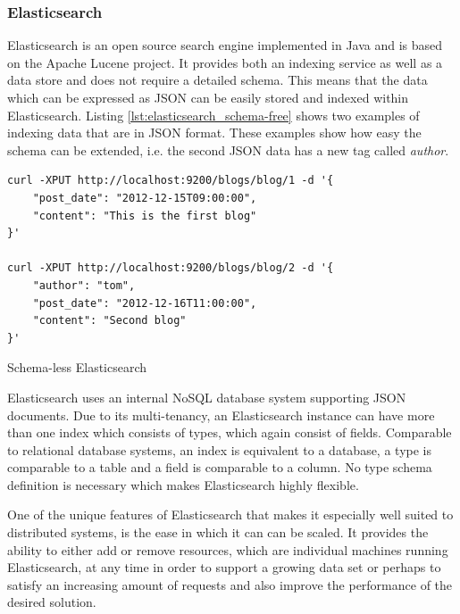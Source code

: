 \subsubsection{Elasticsearch \label{sec:back_se_es}}

Elasticsearch is an open source search engine implemented in Java and is based on the Apache Lucene project. It provides both an indexing service as well as a data store and does not require a detailed schema. This means that the data which can be expressed as \ac{JSON} can be easily stored and indexed within Elasticsearch. Listing \ref{lst:elasticsearch_schema-free} shows two examples of indexing data that are in \ac{JSON} format. These examples show how easy the schema can be extended, i.e. the second \ac{JSON} data has a new tag called \textit{author}.
 
\begin{code}
\begin{verbatim}
curl -XPUT http://localhost:9200/blogs/blog/1 -d '{
    "post_date": "2012-12-15T09:00:00",
    "content": "This is the first blog"
}'

curl -XPUT http://localhost:9200/blogs/blog/2 -d '{
    "author": "tom",
    "post_date": "2012-12-16T11:00:00",
    "content": "Second blog"
}'
\end{verbatim}
\caption{Schema-less Elasticsearch}
\label{lst:elasticsearch_schema-free}
\end{code}


Elasticsearch uses an internal \ac{NoSQL} database system supporting \ac{JSON} documents. Due to its multi-tenancy, an Elasticsearch instance can have more than one index which consists of types, which again consist of fields. Comparable to relational database systems, an index is equivalent to a database, a type is comparable to a table and a field is comparable to a column. No type schema definition is necessary which makes Elasticsearch highly flexible.

One of the unique features of Elasticsearch that makes it especially well suited to distributed systems, is the ease in which it can  can be scaled. It provides the ability to either add or remove resources, which are individual machines running Elasticsearch, at any time in order to support a growing data set or perhaps to satisfy an increasing amount of requests and also improve the performance of the desired solution.

